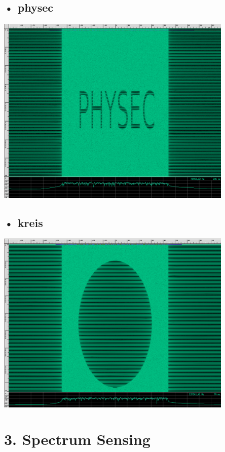 \documentclass[12pt,a4paper]{article}
\begin{document}
\subsection*{• physec}
\includegraphics[width=0.85\textwidth ]{Bilder/A2_physec.png}

\subsection*{• kreis}
\includegraphics[width=0.85\textwidth ]{Bilder/A2_kreis.png}

\section{3. Spectrum Sensing}
\end{document}
